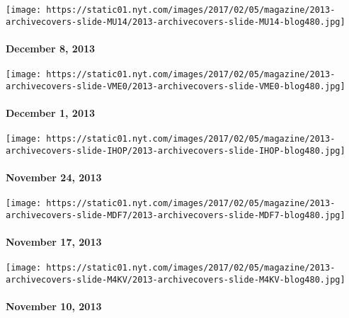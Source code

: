 \texttt{[image: https://static01.nyt.com/images/2017/02/05/magazine/2013-archivecovers-slide-MU14/2013-archivecovers-slide-MU14-blog480.jpg]}

\hypertarget{december-8-2013}{%
\paragraph{December 8, 2013}\label{december-8-2013}}

\href{http://www.nytimes.com/indexes/2013/12/01/magazine/index.html}{}

\texttt{[image: https://static01.nyt.com/images/2017/02/05/magazine/2013-archivecovers-slide-VME0/2013-archivecovers-slide-VME0-blog480.jpg]}

\hypertarget{december-1-2013}{%
\paragraph{December 1, 2013}\label{december-1-2013}}

\href{http://www.nytimes.com/indexes/2013/11/24/magazine/index.html}{}

\texttt{[image: https://static01.nyt.com/images/2017/02/05/magazine/2013-archivecovers-slide-IHOP/2013-archivecovers-slide-IHOP-blog480.jpg]}

\hypertarget{november-24-2013}{%
\paragraph{November 24, 2013}\label{november-24-2013}}

\href{http://www.nytimes.com/indexes/2013/11/17/magazine/index.html}{}

\texttt{[image: https://static01.nyt.com/images/2017/02/05/magazine/2013-archivecovers-slide-MDF7/2013-archivecovers-slide-MDF7-blog480.jpg]}

\hypertarget{november-17-2013}{%
\paragraph{November 17, 2013}\label{november-17-2013}}

\href{http://www.nytimes.com/indexes/2013/11/10/magazine/index.html}{}

\texttt{[image: https://static01.nyt.com/images/2017/02/05/magazine/2013-archivecovers-slide-M4KV/2013-archivecovers-slide-M4KV-blog480.jpg]}

\hypertarget{november-10-2013}{%
\paragraph{November 10, 2013}\label{november-10-2013}}

